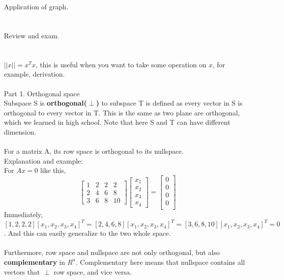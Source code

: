 \documentclass{article}
\begin{document}
\begin{spacing}{1.5}
\section{}
Application of graph.\\


\section{}
Review and exam.\\


\section{}
$||x||=x^Tx$, this is useful when you want to take some operation on $x$, for example, derivation.\\
\\Part 1. Orthogonal space \\
Subspace S is {\bfseries orthogonal($\perp$)} to subspace T is defined as every vector in S is orthogonal to every vector in T. This is the same as two plane are orthogonal, which we learned in high school. Note that here S and T can have different dimension.\\
\\For a matrix A, its row space is orthogonal to its nullspace. \\
Explanation and example: \\
For $Ax=0$ like this,\\
$$
\begin{bmatrix}
1 & 2 & 2 & 2 \\
2 & 4 & 6 & 8 \\ 
3 & 6 & 8 & 10 
\end{bmatrix}
\begin{bmatrix}
x_1 \\
x_2 \\
x_3 \\
x_4
\end{bmatrix}
=
\begin{bmatrix}
0 \\
0 \\
0 \\
0 \\
\end{bmatrix}
$$
Immediately, $[1, 2, 2, 2] [x_1, x_2, x_3, x_4]^T = [2, 4, 6, 8] [x_1, x_2, x_3, x_4]^T = [3, 6, 8, 10] [x_1, x_2, x_3, x_4]^T = 0$. And this can easily generalize to the two whole space.\\
\\Furthermore,  row space and nullspace are not only orthogonal, but also {\bfseries complementary} in $R^n$. Complementary here means that nullspace contains all vectors that $\perp$ row space, and vice versa.\\

\end{spacing}
\end{document}
